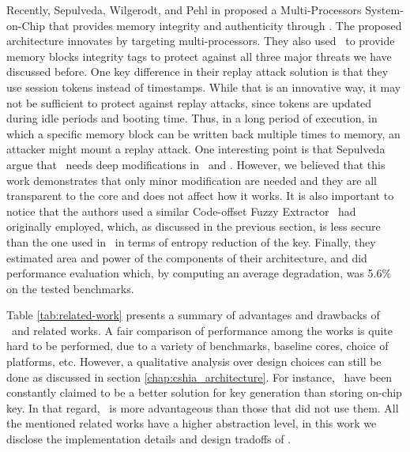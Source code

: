 Recently, Sepulveda, Wilgerodt, and Pehl in \cite{Sepulveda2018:CSHIA} proposed a Multi-Processors System-on-Chip that provides memory integrity and authenticity through \pufs. The proposed architecture innovates by targeting multi-processors. They also used \siphash~to provide memory blocks integrity tags to protect against all three major threats we have discussed before. One key difference in their replay attack solution is that they use session tokens instead of timestamps. While that is an innovative way, it may not be sufficient to protect against replay attacks, since tokens are updated during idle periods and booting time. Thus, in a long period of execution, in which a specific memory block can be written back multiple times to memory, an attacker might mount a replay attack. One interesting point is that Sepulveda \etal argue that \cshia~needs deep modifications in \soc~and \cpu. However, we believed that this work demonstrates that only minor modification are needed and they are all transparent to the core and does not affect how it works. It is also important to notice that the authors used a similar Code-offset Fuzzy Extractor \cshia~had originally employed, which, as discussed in the previous section, is less secure than the one used in \cshia~in terms of entropy reduction of the key. Finally, they estimated area and power of the components of their architecture, and did performance evaluation which, by computing an average degradation, was 5.6\% on the tested benchmarks.

Table \ref{tab:related-work} presents a summary of advantages and drawbacks of \cshia~and related works. A fair comparison of performance among the works is quite hard to be performed, due to a variety of benchmarks, baseline cores, choice of platforms, etc. However, a qualitative analysis over design choices can still be done as discussed in section \ref{chap:cshia_architecture}. For instance, \pufs~have been constantly claimed to be a better solution for key generation than storing on-chip key. In that regard, \cshia~is more advantageous than those that did not use them. All the mentioned related works have a higher abstraction level, in this work we disclose the implementation details  and design tradoffs of \cshia. 






